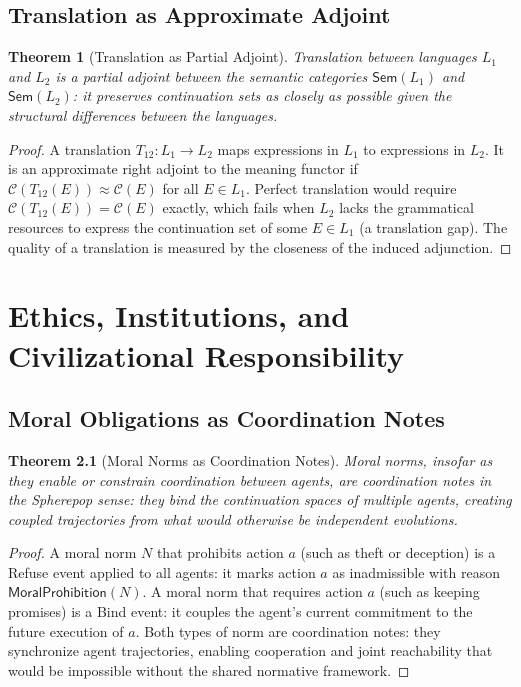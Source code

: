 \documentclass[12pt, a4paper, openany]{book}
\theoremstyle{plain}
\newtheorem{theorem}{Theorem}[chapter]
\theoremstyle{definition}
\theoremstyle{remark}
\newcommand{\calC}{\mathcal{C}}
\begin{document}
\section{Translation as Approximate Adjoint}

\begin{theorem}[Translation as Partial Adjoint]
Translation between languages $L_1$ and $L_2$ is a partial adjoint between
the semantic categories $\mathsf{Sem}(L_1)$ and $\mathsf{Sem}(L_2)$: it
preserves continuation sets as closely as possible given the structural
differences between the languages.
\end{theorem}

\begin{proof}
A translation $T_{12} : L_1 \to L_2$ maps expressions in $L_1$ to expressions
in $L_2$. It is an approximate right adjoint to the meaning functor if
$\calC(T_{12}(E)) \approx \calC(E)$ for all $E \in L_1$. Perfect translation
would require $\calC(T_{12}(E)) = \calC(E)$ exactly, which fails when $L_2$
lacks the grammatical resources to express the continuation set of some
$E \in L_1$ (a translation gap). The quality of a translation is measured by
the closeness of the induced adjunction.
\end{proof}

\chapter{Ethics, Institutions, and Civilizational Responsibility}

\section{Moral Obligations as Coordination Notes}

\begin{theorem}[Moral Norms as Coordination Notes]
Moral norms, insofar as they enable or constrain coordination between agents,
are coordination notes in the Spherepop sense: they bind the continuation
spaces of multiple agents, creating coupled trajectories from what would
otherwise be independent evolutions.
\end{theorem}

\begin{proof}
A moral norm $N$ that prohibits action $a$ (such as theft or deception) is a
Refuse event applied to all agents: it marks action $a$ as inadmissible with
reason $\mathsf{MoralProhibition}(N)$. A moral norm that requires action $a$
(such as keeping promises) is a Bind event: it couples the agent's current
commitment to the future execution of $a$. Both types of norm are coordination
notes: they synchronize agent trajectories, enabling cooperation and joint
reachability that would be impossible without the shared normative framework.
\end{proof}
\end{document}
